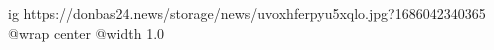  
 
 
 
 

\ifcmt
  ig https://donbas24.news/storage/news/uvoxhferpyu5xqlo.jpg?1686042340365
  @wrap center
  @width 1.0
\fi
